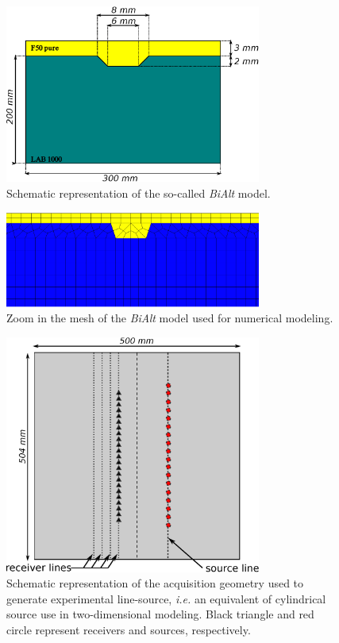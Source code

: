 \documentclass[manuscript,revised]{geophysics}
\newcommand{\bialt}{\textit{BiAlt} }
\begin{document}
\begin{figure}[!h]
	\centering
	\includegraphics[width=0.75\textwidth]{fig/bialt_model.eps}
	\caption{Schematic representation of the so-called \bialt model.}
	\label{panel_bialt_model}
\end{figure}

\begin{figure}[!h]
	\centering
	\includegraphics[width=0.75\textwidth]{fig/bialt-mesh.eps}
	\caption{Zoom in the mesh of the \bialt model used for numerical modeling.}
	\label{panel_bialt_mesh}
\end{figure}

\begin{figure}[!h]
	\centering
	\includegraphics[width=0.75\textwidth]{fig/amplitude_acqui_principle.eps}
	\caption{Schematic representation of the acquisition geometry used to generate experimental line-source, \textit{i.e.} an equivalent of cylindrical source use in two-dimensional modeling. Black triangle and red circle represent receivers and sources, respectively.}
	\label{amplitude_acqui_principle}
\end{figure}
\end{document}
